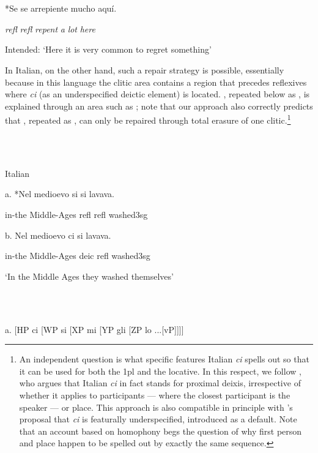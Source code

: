 \documentclass[output=paper,colorlinks,citecolor=brown]{./langscibook}
\begin{document}
\ea%
    \label{ex:key:25}
    \gll\\
        \\
    \glt
    \z

         *Se se   arrepiente mucho aquí.

     \textit{refl} \textit{refl}  \textit{repent}     \textit{a} \textit{lot}   \textit{here}

   Intended: ‘Here it is very common to regret something’

In Italian, on the other hand, such a repair strategy is possible, essentially because in this language the clitic area contains a region that precedes reflexives where \textit{ci} (as an underspecified deictic element) is located. , repeated below as , is explained through an area such as ; note that our approach also correctly predicts that , repeated as , can only be repaired through total erasure of one clitic.\footnote{An independent question is what specific features Italian \textit{ci} spells out so that it can be used for both the 1pl and the locative. In this respect, we follow \citet{Ferrazzano2003}, who argues that Italian \textit{ci} in fact stands for proximal deixis, irrespective of whether it applies to participants — where the closest participant is the speaker — or place. This approach is also compatible in principle with \citeauthor{Pescarini2007}’s proposal that \textit{ci} is featurally underspecified, introduced as a default. Note that an account based on homophony begs the question of why first person and place happen to be spelled out by exactly the same sequence.} 

\ea%
    \label{ex:key:26}
    \gll\\
        \\
    \glt
    \z

         Italian 

  a. *Nel medioevo   si  si   lavava. 

         in-the Middle-Ages  refl  refl  washed3sg    

  b. Nel medioevo  ci  si  lavava.

      in-the Middle-Ages  deic  refl  washed3sg    

  ‘In the Middle Ages they washed themselves’

\ea%
    \label{ex:key:27}
    \gll\\
        \\
    \glt
    \z

        a. [HP  ci   [WP   si  [XP  mi  [YP  gli  [ZP lo  ...[vP]]]]
\end{document}

